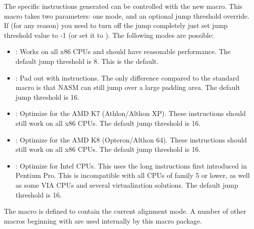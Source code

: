 The specific instructions generated can be controlled with the
new  macro. This macro takes two parameters: one mode,
and an optional jump threshold override. If (for any reason) you need
to turn off the jump completely just set jump threshold value to -1
(or set it to ). The following modes are possible:

\begin{itemize}
    \item{: Works on all x86 CPUs and should have
    reasonable performance. The default jump threshold is 8.
    This is the default.}

    \item{: Pad out with  instructions. The only
    difference compared to the standard  macro is that NASM
    can still jump over a large padding area. The default jump
    threshold is 16.}

    \item{: Optimize for the AMD K7 (Athlon/Althon XP).
    These instructions should still work on all x86 CPUs. The default
    jump threshold is 16.}

    \item{: Optimize for the AMD K8 (Opteron/Althon 64).
    These instructions should still work on all x86 CPUs. The default
    jump threshold is 16.}

    \item{: Optimize for Intel CPUs. This uses the long
     instructions first introduced in Pentium Pro. This
    is incompatible with all CPUs of family 5 or lower, as well as
    some VIA CPUs and several virtualization solutions. The default
    jump threshold is 16.}
\end{itemize}

The macro  is defined to contain the
current alignment mode. A number of other macros beginning with
 are used internally by this macro package.
